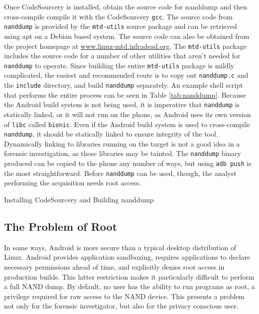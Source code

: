 Once CodeSourcery is installed, obtain the source code for nanddump and then cross-compile compile it with the CodeSourcery
\texttt{gcc}.  The source code from \texttt{nanddump} is provided by the \texttt{mtd-utils} source package and can be retrieved
using apt on a Debian based system.  The source code can also be obtained from the project homepage at
\url{www.linux-mtd.infradead.org}.  The \texttt{mtd-utils} package includes the source code for a number of other utilities that
aren't needed for \texttt{nanddump} to operate.  Since building the entire \texttt{mtd-utils} package is mildly complicated, the
easiest and recommended route is to copy out \texttt{nanddump.c} and the \texttt{include} directory, and build \texttt{nanddump}
separately.  An example shell script that performs the entire process can be seen in Table \ref{tab:nanddump}.  Because the Android
build system is not being used, it is imperative that \texttt{nanddump} is statically linked, or it will not run on the phone, as
Android uses its own version of \texttt{libc} called \texttt{bionic}.  Even if the Android build system is used to cross-compile
\texttt{nanddump}, it should be statically linked to ensure integrity of the tool.  Dynamically linking to libraries running on the
target is not a good idea in a forensic investigation, as those libraries may be tainted.  The \texttt{nanddump} binary produced can
be copied to the phone any number of ways, but using \texttt{adb push} is the most straightforward.  Before \texttt{nanddump} can be
used, though, the analyst performing the acquisition needs root access.

\begin{table}

\caption{Installing CodeSourcery and Building nanddump}
\label{tab:nanddump}
\end{table}

\subsection{The Problem of Root}
In some ways, Android is more secure than a typical desktop distribution of Linux.  Android provides application sandboxing,
requires applications to declare necessary permissions ahead of time, and explicitly denies root access in production builds. This
latter restriction makes it particularly difficult to perform a full NAND dump.  By default, no user has the ability to run programs
as root, a privilege required for raw access to the NAND device.  This presents a problem not only for the forensic investigator,
but also for the privacy conscious user.

